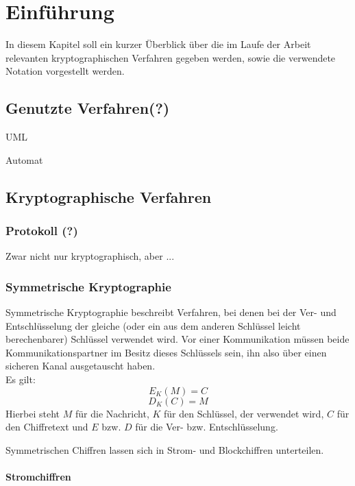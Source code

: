 \chapter{Einführung}

\label{cha_cryptographic_techniques}

In diesem Kapitel soll ein kurzer Überblick über die im Laufe der Arbeit relevanten kryptographischen Verfahren gegeben werden, sowie die verwendete Notation vorgestellt werden.

\section{Genutzte Verfahren(?)}

UML

Automat



\section{Kryptographische Verfahren}


\subsection{Protokoll (?)}

Zwar nicht nur kryptographisch, aber ...

\subsection{Symmetrische Kryptographie}

Symmetrische Kryptographie beschreibt Verfahren, bei denen bei der Ver- und Entschlüsselung der gleiche (oder ein aus dem anderen Schlüssel leicht berechenbarer) Schlüssel verwendet wird. Vor einer Kommunikation müssen beide Kommunikationspartner im Besitz dieses Schlüssels sein, ihn also über einen sicheren Kanal ausgetauscht haben.\\
Es gilt:
\[E_K(M)=C\] 
\[D_K(C)=M\] 
Hierbei steht \(M\) für die Nachricht, \(K\) für den Schlüssel, der verwendet wird, \(C\) für den Chiffretext und \(E\) bzw. \(D\) für die Ver- bzw. Entschlüsselung.

Symmetrischen Chiffren lassen sich in Strom- und Blockchiffren unterteilen.

\subsubsection{Stromchiffren}

